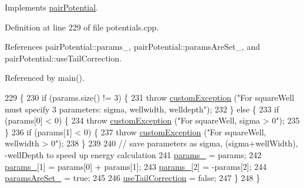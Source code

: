 Implements \hyperlink{classpair_potential_ad4b237646f9de2ae9f95cc9350564bc5}{pair\+Potential}.



Definition at line 229 of file potentials.\+cpp.



References pair\+Potential\+::params\+\_\+, pair\+Potential\+::params\+Are\+Set\+\_\+, and pair\+Potential\+::use\+Tail\+Correction.



Referenced by main().


\begin{DoxyCode}
229                                                                  \{
230                 \textcolor{keywordflow}{if} (params.size() != 3) \{
231                                 \textcolor{keywordflow}{throw} \hyperlink{classcustom_exception}{customException} (\textcolor{stringliteral}{"For squareWell must specify 3
       parameters: sigma, wellwidth, welldepth"});
232                 \} \textcolor{keywordflow}{else} \{
233                                 \textcolor{keywordflow}{if} (params[0] < 0) \{
234                                                 \textcolor{keywordflow}{throw} \hyperlink{classcustom_exception}{customException} (\textcolor{stringliteral}{"For squareWell,
       sigma > 0"});
235                                 \}
236                                 \textcolor{keywordflow}{if} (params[1] < 0) \{
237                                                 \textcolor{keywordflow}{throw} \hyperlink{classcustom_exception}{customException} (\textcolor{stringliteral}{"For squareWell,
       wellwidth > 0"});
238                                 \}
239                                 
240                                 \textcolor{comment}{// save parameters as sigma, (sigma+wellWidth), -wellDepth to speed up
       energy calculation}
241                                 \hyperlink{classpair_potential_abf8ec8af983d6e9960bd149da099e883}{params\_} = params;
242                                 \hyperlink{classpair_potential_abf8ec8af983d6e9960bd149da099e883}{params\_}[1] = params[0] + params[1];
243                                 \hyperlink{classpair_potential_abf8ec8af983d6e9960bd149da099e883}{params\_}[2] = -params[2];
244                                 \hyperlink{classpair_potential_a635755c0a952bfc05a4cfae230c3dbd2}{paramsAreSet\_} = \textcolor{keyword}{true};
245                                 
246                                 \hyperlink{classpair_potential_ab4b4538a7e13771f50a29aaac2443037}{useTailCorrection} = \textcolor{keyword}{false};
247                 \}
248 \}
\end{DoxyCode}
\hypertarget{classsquare_well_a3a81297ea3a06f8a354c824a7ac5dc94}{}
